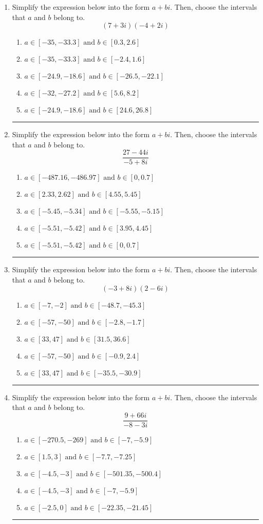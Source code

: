 \documentclass[14pt]{extbook}
\newcommand{\litem}[1]{\item#1\hspace*{-1cm}\rule{\textwidth}{0.4pt}}
\begin{document}
\begin{enumerate}
{\begin{enumerate}[label=\Alph*.]
\end{enumerate} }
\litem{
Simplify the expression below into the form $a+bi$. Then, choose the intervals that $a$ and $b$ belong to.\[ (7 + 3 i)(-4 + 2 i) \]\begin{enumerate}[label=\Alph*.]
\item \( a \in [-35, -33.3] \text{ and } b \in [0.3, 2.6] \)
\item \( a \in [-35, -33.3] \text{ and } b \in [-2.4, 1.6] \)
\item \( a \in [-24.9, -18.6] \text{ and } b \in [-26.5, -22.1] \)
\item \( a \in [-32, -27.2] \text{ and } b \in [5.6, 8.2] \)
\item \( a \in [-24.9, -18.6] \text{ and } b \in [24.6, 26.8] \)

\end{enumerate} }
\litem{
Simplify the expression below into the form $a+bi$. Then, choose the intervals that $a$ and $b$ belong to.\[ \frac{27 - 44 i}{-5 + 8 i} \]\begin{enumerate}[label=\Alph*.]
\item \( a \in [-487.16, -486.97] \text{ and } b \in [0, 0.7] \)
\item \( a \in [2.33, 2.62] \text{ and } b \in [4.55, 5.45] \)
\item \( a \in [-5.45, -5.34] \text{ and } b \in [-5.55, -5.15] \)
\item \( a \in [-5.51, -5.42] \text{ and } b \in [3.95, 4.45] \)
\item \( a \in [-5.51, -5.42] \text{ and } b \in [0, 0.7] \)

\end{enumerate} }
\litem{
Simplify the expression below into the form $a+bi$. Then, choose the intervals that $a$ and $b$ belong to.\[ (-3 + 8 i)(2 - 6 i) \]\begin{enumerate}[label=\Alph*.]
\item \( a \in [-7, -2] \text{ and } b \in [-48.7, -45.3] \)
\item \( a \in [-57, -50] \text{ and } b \in [-2.8, -1.7] \)
\item \( a \in [33, 47] \text{ and } b \in [31.5, 36.6] \)
\item \( a \in [-57, -50] \text{ and } b \in [-0.9, 2.4] \)
\item \( a \in [33, 47] \text{ and } b \in [-35.5, -30.9] \)

\end{enumerate} }
\litem{
Simplify the expression below into the form $a+bi$. Then, choose the intervals that $a$ and $b$ belong to.\[ \frac{9 + 66 i}{-8 - 3 i} \]\begin{enumerate}[label=\Alph*.]
\item \( a \in [-270.5, -269] \text{ and } b \in [-7, -5.9] \)
\item \( a \in [1.5, 3] \text{ and } b \in [-7.7, -7.25] \)
\item \( a \in [-4.5, -3] \text{ and } b \in [-501.35, -500.4] \)
\item \( a \in [-4.5, -3] \text{ and } b \in [-7, -5.9] \)
\item \( a \in [-2.5, 0] \text{ and } b \in [-22.35, -21.45] \)


\end{enumerate}}
\end{enumerate}
\end{document}
